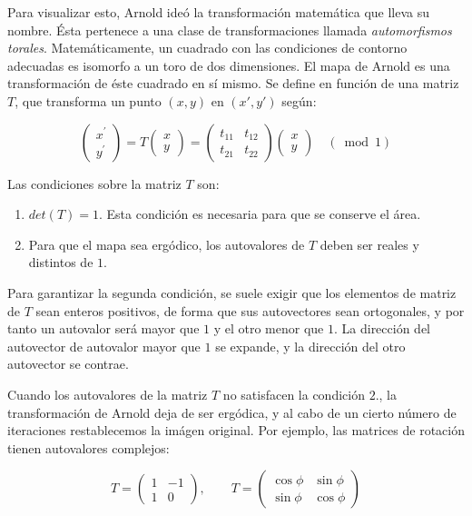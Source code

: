 \documentclass[11pt, a4paper]{article} %
\theoremstyle{named}
\begin{document}
Para visualizar esto, Arnold ideó la transformación matemática que lleva su nombre. Ésta pertenece a una clase de transformaciones llamada \textit{automorfismos torales}. Matemáticamente, un cuadrado con las condiciones de contorno adecuadas es isomorfo a un toro de dos dimensiones. El mapa de Arnold es una transformación de éste cuadrado en sí mismo. Se define en función de una matriz $T$, que transforma un punto $(x, y)$ en  $(x', y')$ según:

$$
\left(\begin{array}{l}
{x^{\prime}} \\
{y^{\prime}}
\end{array}\right)=T\left(\begin{array}{l}
{x} \\
{y}
\end{array}\right)=\left(\begin{array}{ll}
{t_{11}} & {t_{12}} \\
{t_{21}} & {t_{22}}
\end{array}\right)\left(\begin{array}{l}
{x} \\
{y}
\end{array}\right) \quad(\bmod 1)
$$

Las condiciones sobre la matriz $T$ son:

\begin{enumerate}
    \item $det(T) = 1$. Esta condición es necesaria para que se conserve el área.
    \item Para que el mapa sea ergódico, los autovalores de $T$ deben ser reales y distintos de $1$.
\end{enumerate}

Para garantizar la segunda condición, se suele exigir que los elementos de matriz de $T$ sean enteros positivos, de forma que sus autovectores sean ortogonales, y por tanto un autovalor será mayor que $1$ y el otro menor que $1$. La dirección del autovector de autovalor mayor que $1$ se expande, y la dirección del otro autovector se contrae.

Cuando los autovalores de la matriz $T$ no satisfacen la condición $2.$, la transformación de Arnold deja de ser ergódica, y al cabo de un cierto número de iteraciones restablecemos la imágen original. Por ejemplo, las matrices de rotación tienen autovalores complejos:

$$
T = \begin{pmatrix} 1 & -1 \\ 1 & 0
\end{pmatrix}, \qquad
T = \begin{pmatrix} \cos\phi & \sin\phi \\ \sin\phi & \cos\phi
\end{pmatrix}
$$
\end{document}
